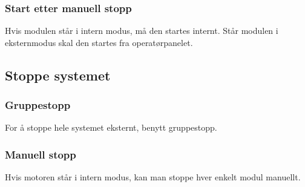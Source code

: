 \subsubsection*{Start etter manuell stopp}
Hvis modulen står i intern modus, må den startes internt. Står modulen i eksternmodus skal den startes fra operatørpanelet. 

\subsection{Stoppe systemet}
\subsubsection*{Gruppestopp}
For å stoppe hele systemet eksternt, benytt gruppestopp.
\subsubsection*{Manuell stopp}
Hvis motoren står i intern modus, kan man stoppe hver enkelt modul manuellt. 

